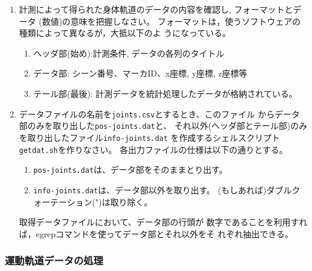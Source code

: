 \documentclass{jsarticle}
\begin{document}
\begin{enumerate}
\item 計測によって得られた身体軌道のデータの内容を確認し, フォーマットとデータ
  (数値)の意味を把握しなさい。
  フォーマットは，使うソフトウェアの種類によって異なるが，大抵以下のよ
  うになっている。
  \begin{enumerate}
  \item ヘッダ部(始め):計測条件, データの各列のタイトル
  \item データ部: シーン番号、マーカID、x座標, y座標, z座標等
  \item テール部(最後): 計測データを統計処理したデータが格納されている。
  \end{enumerate}
\item データファイルの名前を\verb|joints.csv|とするとき、このファイル
  からデータ部のみを取り出した\verb|pos-joints.dat|と、
  それ以外(ヘッダ部とテール部)のみを取り出したファイル\verb|info-joints.dat|
  を作成するシェルスクリプト\verb|getdat.sh|を作りなさい。
  各出力ファイルの仕様は以下の通りとする。
  \begin{enumerate}
  \item \verb|pos-joints.dat|は、データ部をそのままとり出す。
  \item \verb|info-joints.dat|は、データ部以外を取り出す。
    (もしあれば)ダブルクォーテーション(")は取り除く。
  \end{enumerate}
  取得データファイルにおいて、データ部の行頭が
  数字であることを利用すれば，egrepコマンドを使ってデータ部とそれ以外をそ
  れぞれ抽出できる。
\end{enumerate}


\subsubsection{運動軌道データの処理}
\end{document}
